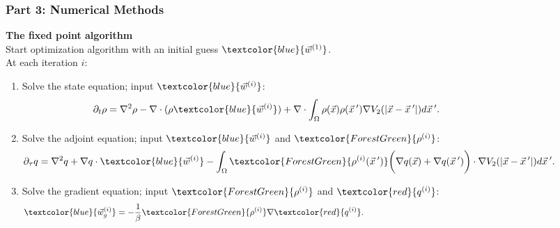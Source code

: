 \documentclass[aspectratio=169,xcolor=dvipsnames]{beamer}
\begin{document}
\begin{frame}
	\frametitle{Part 3: Numerical Methods}
	\vspace{0.5cm}
	\textbf{The fixed point algorithm}\\
	Start optimization algorithm with an initial guess $\textcolor{blue}{\vec{w}^{(1)}}$.\\
	\vspace{0.3cm}
	At each iteration $i$:
	\begin{enumerate}
     \item Solve the state equation; input $\textcolor{blue}{\vec{w}^{(i)}}$:
     \begin{align*}
     \partial_t \rho  = \nabla^2 \rho  - \nabla \cdot (\rho \textcolor{blue}{\vec{w}^{(i)}} )
     + \nabla \cdot \int_\Omega \rho(\vec{x}) \rho(\vec{x}\hspace{0.2em}') \nabla V_2(|\vec{x}-\vec{x}\hspace{0.2em}'|)d\vec{x}\hspace{0.2em}'. \phantom{abcdefghijklmnopqrs}
     \end{align*}
     \item Solve the adjoint equation; input $\textcolor{blue}{\vec{w}^{(i)}}$ and $\textcolor{ForestGreen}{{\rho}^{(i)}}$:
     \begin{align*}
     \partial_{{\tau}} q  = \nabla^2 q  + \nabla q  \cdot \textcolor{blue}{\vec{w}^{(i)}}  
     - \int_\Omega \textcolor{ForestGreen}{\rho^{(i)}(\vec{x}\hspace{0.2em}')} \bigg(\nabla q( \vec{x} ) + \nabla q( \vec{x}\hspace{0.2em}')\bigg) \cdot \nabla V_2(|\vec{x}-\vec{x}\hspace{0.2em}'|)d\vec{x}\hspace{0.2em}'. \phantom{abcdefghijklm}
     \end{align*}
     \item Solve the gradient equation; input $\textcolor{ForestGreen}{{\rho}^{(i)}}$ and $\textcolor{red}{{q}^{(i)}}$:
     \begin{align*}
     \textcolor{blue}{\vec{w}^{(i)}_g} = - \frac{1}{\beta}\textcolor{ForestGreen}{{\rho}^{(i)}} \nabla \textcolor{red}{{q}^{(i)}}. \phantom{abcdefghijklmnopqr   ykabtw    btkspa abcdefghijklmnopqr   ykabtw    btksp}
     \end{align*}
	\end{enumerate}	
\end{frame}
\end{document}
